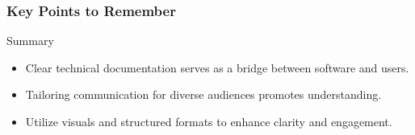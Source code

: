 \documentclass{beamer}
\begin{document}
\begin{frame}[fragile]
    \frametitle{Key Points to Remember}
    \begin{block}{Summary}
        \begin{itemize}
            \item Clear technical documentation serves as a bridge between software and users.
            \item Tailoring communication for diverse audiences promotes understanding.
            \item Utilize visuals and structured formats to enhance clarity and engagement.
        \end{itemize}
    \end{block}
\end{frame}
\end{document}
